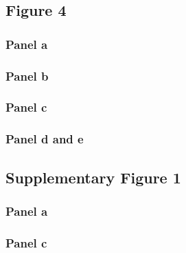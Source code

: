 \documentclass[
  12pt,
  letterpaper,
]{article}
\begin{document}
\subsection{Figure 4}\label{figure-4}

\subsubsection{Panel a}\label{panel-a-2}

\subsubsection{Panel b}\label{panel-b-2}

\subsubsection{Panel c}\label{panel-c-2}

\subsubsection{Panel d and e}\label{panel-d-and-e}

\subsection{Supplementary Figure 1}\label{supplementary-figure-1}

\subsubsection{Panel a}\label{panel-a-3}

\subsubsection{Panel c}\label{panel-c-3}

\printbibliography
\end{document}
